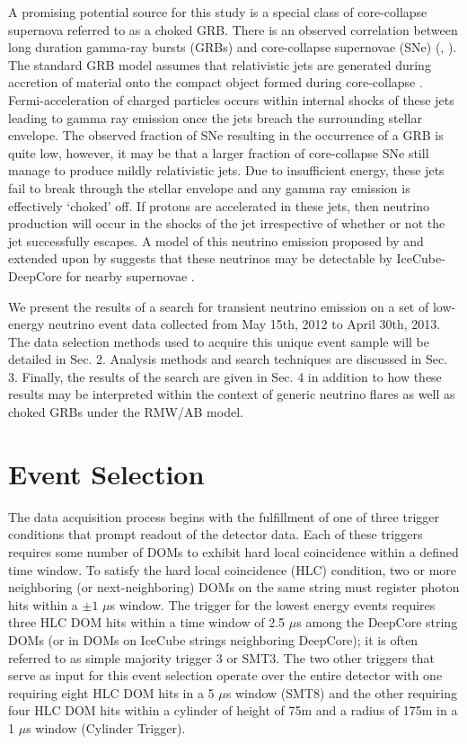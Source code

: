 \documentclass[manuscript]{aastex}
\begin{document}
A promising potential source for this study is a special class of core-collapse supernova referred to as a choked GRB. There is an observed correlation between long duration gamma-ray bursts (GRBs) and core-collapse supernovae (SNe) (\citep{2006ARA&A..44..507W}, \citep{2011AN....332..434M}).  The standard GRB model assumes that relativistic jets are generated during accretion of material onto the compact object formed during core-collapse \citep{1992MNRAS.258P..41R}. Fermi-acceleration of charged particles occurs within internal shocks of these jets leading to gamma ray emission once the jets breach the surrounding stellar envelope.  The observed fraction of SNe resulting in the occurrence of a GRB is quite low, however, it may be that a larger fraction of core-collapse SNe still manage to produce mildly relativistic jets.  Due to insufficient energy, these jets fail to break through the stellar envelope and any gamma ray emission is effectively `choked' off. If protons are accelerated in these jets, then neutrino production will occur in the shocks of the jet irrespective of whether or not the jet successfully escapes. A model of this neutrino emission proposed by \cite{2004PhRvL..93r1101R} and extended upon by \cite{2005PhRvL..95f1103A} suggests that these neutrinos may be detectable by IceCube-DeepCore for nearby supernovae \citep{PhysRevD.81.083011}.

We present the results of a search for transient neutrino emission on a set of low-energy neutrino event data collected from May 15th, 2012 to April 30th, 2013. The data selection methods used to acquire this unique event sample will be detailed in Sec. 2. Analysis methods and search techniques are discussed in Sec. 3. Finally, the results of the search are given in Sec. 4 in addition to how these results may be interpreted within the context of generic neutrino flares as well as choked GRBs under the RMW/AB model.
\section{Event Selection}

The data acquisition process begins with the fulfillment of one of three trigger conditions that prompt readout of the detector data. Each of these triggers requires some number of DOMs to exhibit hard local coincidence within a defined time window. To satisfy the hard local coincidence (HLC) condition, two or more neighboring (or next-neighboring) DOMs on the same string must register photon hits within a $\pm1$ $\mu$s window. The trigger for the lowest energy events requires three HLC DOM hits within a time window of 2.5 $\mu$s among the DeepCore string DOMs (or in DOMs on IceCube strings neighboring DeepCore); it is often referred to as simple majority trigger 3 or SMT3. The two other triggers that serve as input for this event selection operate over the entire detector with one requiring eight HLC DOM hits in a 5 $\mu$s window (SMT8) and the other requiring four HLC DOM hits within a cylinder of height of 75m and a radius of 175m in a 1 $\mu$s window (Cylinder Trigger).
\end{document}
